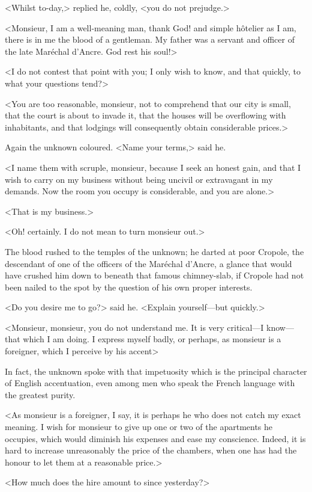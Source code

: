 <Whilst to-day,> replied he, coldly, <you do not prejudge.>

<Monsieur, I am a well-meaning man, thank God! and simple hôtelier as I am, there is in me the blood of a gentleman. My father was a servant and officer of the late Maréchal d'Ancre. God rest his soul!>

<I do not contest that point with you; I only wish to know, and that quickly, to what your questions tend?>

<You are too reasonable, monsieur, not to comprehend that our city is small, that the court is about to invade it, that the houses will be overflowing with inhabitants, and that lodgings will consequently obtain considerable prices.>

Again the unknown coloured. <Name your terms,> said he.

<I name them with scruple, monsieur, because I seek an honest gain, and that I wish to carry on my business without being uncivil or extravagant in my demands. Now the room you occupy is considerable, and you are alone.>

<That is my business.>

<Oh! certainly. I do not mean to turn monsieur out.>

The blood rushed to the temples of the unknown; he darted at poor Cropole, the descendant of one of the officers of the Maréchal d'Ancre, a glance that would have crushed him down to beneath that famous chimney-slab, if Cropole had not been nailed to the spot by the question of his own proper interests.

<Do you desire me to go?> said he. <Explain yourself—but quickly.>

<Monsieur, monsieur, you do not understand me. It is very critical—I know—that which I am doing. I express myself badly, or perhaps, as monsieur is a foreigner, which I perceive by his accent\longdash>

In fact, the unknown spoke with that impetuosity which is the principal character of English accentuation, even among men who speak the French language with the greatest purity.

<As monsieur is a foreigner, I say, it is perhaps he who does not catch my exact meaning. I wish for monsieur to give up one or two of the apartments he occupies, which would diminish his expenses and ease my conscience. Indeed, it is hard to increase unreasonably the price of the chambers, when one has had the honour to let them at a reasonable price.>

<How much does the hire amount to since yesterday?>


